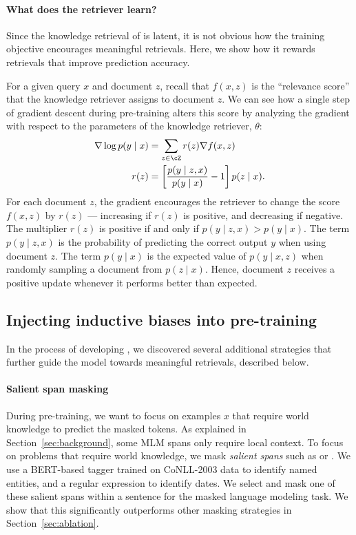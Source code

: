 \paragraph{What does the retriever learn?}
Since the knowledge retrieval of \thename is latent, it is not obvious how the training objective encourages meaningful retrievals. Here, we show how it rewards retrievals that improve prediction accuracy.

For a given query $x$ and document $z$, recall that $f(x,z)$
is the ``relevance score'' that the knowledge retriever assigns to document $z$.
We can see how a single step of gradient descent during \thename pre-training alters this score by analyzing
the gradient with respect to the parameters of the knowledge retriever, $\theta$:
\begin{align*}
\nabla \log p(y \mid x) & =\sum_{z\in\cZ} r(z) \nabla f(x,z) \\
r(z) & =\left[\frac{p(y \mid z,x)}{p(y \mid x)}-1\right]p(z \mid x).
\end{align*}
For each document $z$, the gradient encourages
the retriever to change the score $f(x,z)$ by $r(z)$ --- 
increasing if $r(z)$ is positive, and decreasing if negative.
The multiplier $r(z)$
is positive if and only if $p(y\mid z,x) > p(y\mid x)$.
The term $p(y\mid z,x)$ is the probability of predicting
the correct output $y$ when using document $z$.
The term $p(y \mid x)$ is the expected value of $p(y \mid x, z)$ when randomly sampling a document from $p(z \mid x)$. Hence, document $z$ receives a positive update whenever it performs better than expected.

\subsection{Injecting inductive biases into pre-training} \label{sec:inductive-bias}
In the process of developing \thename, we discovered several additional strategies that further guide the model towards meaningful retrievals, described below.

\paragraph{Salient span masking}
During \thename pre-training, we want to focus on examples $x$ that require world knowledge to predict the masked tokens. As explained in Section~\ref{sec:background}, some MLM spans only require local context. To focus on problems that require world knowledge, we mask \emph{salient spans} such as  or . We use a BERT-based tagger trained on CoNLL-2003 data \cite{conll_ner} to identify named entities, and a regular expression to identify dates. We select and mask one of these salient spans within a sentence for the masked language modeling task. We show that this significantly outperforms other masking strategies in Section~\ref{sec:ablation}.

